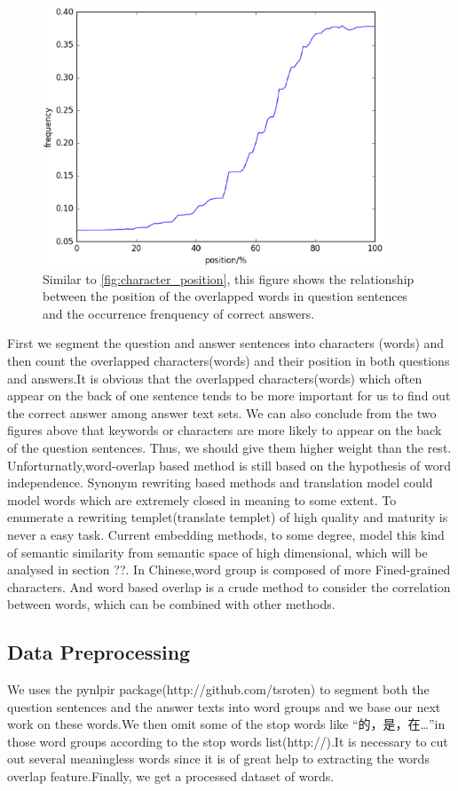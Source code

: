 \documentclass{llncs}
\begin{document}
\begin{figure}
\centering
\includegraphics[width=4in]{figures/word_position.eps}
\caption{Similar to \ref{fig:character_position}, this figure shows the relationship between the position of the overlapped words in question sentences and the occurrence frenquency of correct answers.}
\label{fig:word_position}
\end{figure}



First we segment the question and answer sentences into characters (words) and then count the overlapped characters(words) and their position in both questions and answers.It is obvious that the overlapped characters(words) which often appear on the back of one sentence tends to be more important for us to find out the correct answer among answer text sets. We can also conclude from the two figures above that keywords or characters are more likely to appear on the back of the question sentences. Thus, we should give them higher weight than the rest.
Unforturnatly,word-overlap based method is still based on the hypothesis of word independence. Synonym rewriting based methods and translation model could model words which are extremely closed in meaning to some extent. To enumerate a rewriting templet(translate templet) of high quality and maturity is never a easy task. Current embedding methods, to some degree, model this kind of semantic similarity from semantic space of high dimensional, which will be analysed in section ??.
In Chinese,word group is composed of more Fined-grained characters. And word based overlap is a crude method to consider the correlation between words, which can be combined with other methods.


\subsection{Data Preprocessing}
We uses the pynlpir package(http://github.com/tsroten) to segment both the question sentences and the answer texts into word groups and we base our next work on these words.We then omit some of the stop words like “的，是，在…”in those word groups according to the stop words list(http://).It is necessary to cut out several meaningless words since it is of great help to extracting the words overlap feature.Finally, we get a processed dataset of words.
\end{document}
